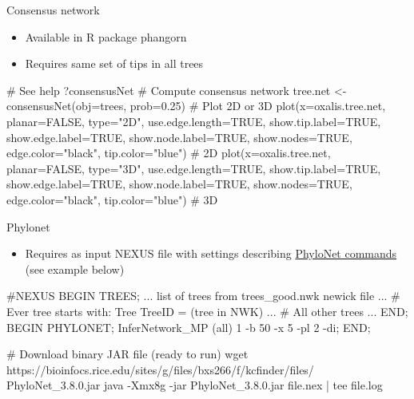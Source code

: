 \documentclass[compress, ucs, xelatex, 11pt, xcolor=x11names, aspectratio=169,
	hyperref={
		bookmarks=true,
		unicode=true,
		colorlinks=true,
		pdftitle={HybSeq course},
		plainpages=false,
		pdfauthor={Vojtech Zeisek},
		pdfsubject={Practical processing of HybSeq target enrichment sequencing data on computing grids like MetaCentrum},
		pdfcreator={XeLaTeX},
		pdfkeywords={BASH, command line, GNU, HybSeq, Linux, MetaCentrum, sequencing shell, target enrichment},
		linkcolor=Cyan2, %
		anchorcolor=Firebrick2, %
		citecolor=Firebrick2, %
		filecolor=Firebrick2, %
		menucolor=Firebrick2, %
		urlcolor=Chartreuse2, %
		pdftex},
	url={hyphens, lowtilde} %
	]{beamer}
\renewcommand{\texttt}[1]{\colorbox{Snow4}{{\ttfamily #1}}}
\begin{document}
\begin{frame}[fragile]{Consensus network}
	\begin{itemize}
		\item Available in \texttt{R} package \texttt{phangorn}
		\item Requires same set of tips in all trees
	\end{itemize}
	\begin{spluscode}
    # See help
    ?consensusNet
    # Compute consensus network
    tree.net <- consensusNet(obj=trees, prob=0.25)
    # Plot 2D or 3D
    plot(x=oxalis.tree.net, planar=FALSE, type="2D", use.edge.length=TRUE,
      show.tip.label=TRUE, show.edge.label=TRUE, show.node.label=TRUE,
      show.nodes=TRUE, edge.color="black", tip.color="blue") # 2D
    plot(x=oxalis.tree.net, planar=FALSE, type="3D", use.edge.length=TRUE,
      show.tip.label=TRUE, show.edge.label=TRUE, show.node.label=TRUE,
      show.nodes=TRUE, edge.color="black", tip.color="blue") # 3D
	\end{spluscode}
\end{frame}

\begin{frame}[fragile]{Phylonet}
	\begin{itemize}
		\item Requires as input NEXUS file with settings describing \href{https://wiki.rice.edu/confluence/display/PHYLONET/List+of+PhyloNet+Commands}{PhyloNet commands} (see example below)
	\end{itemize}
	\begin{bashcode}
    #NEXUS
    BEGIN TREES;
    ... list of trees from trees_good.nwk newick file ...
    # Ever tree starts with:
    Tree TreeID = (tree in NWK)
    ... # All other trees ...
    END;
    BEGIN PHYLONET;
    InferNetwork_MP (all) 1 -b 50 -x 5 -pl 2 -di;
    END;

    # Download binary JAR file (ready to run)
    wget https://bioinfocs.rice.edu/sites/g/files/bxs266/f/kcfinder/files/
      PhyloNet_3.8.0.jar
    java -Xmx8g -jar PhyloNet_3.8.0.jar file.nex | tee file.log
	\end{bashcode}
\end{frame}
\end{document}
